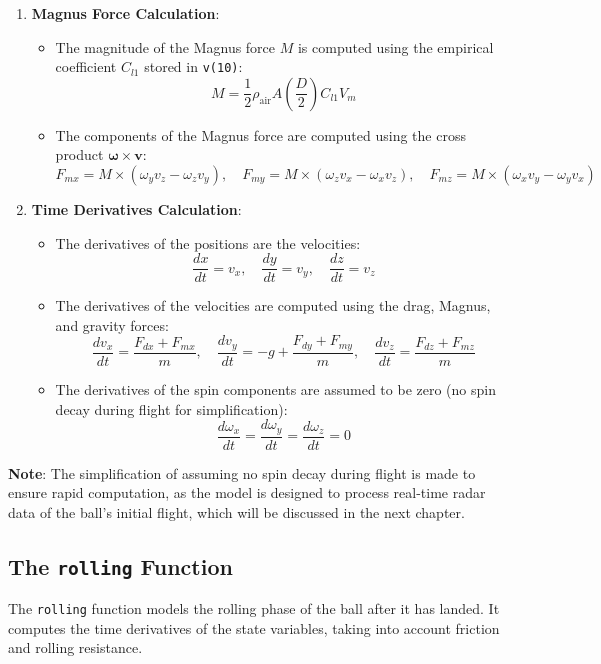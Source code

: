 \documentclass[10pt,a4paper]{report}
\begin{document}
\begin{enumerate}
    \item \textbf{Magnus Force Calculation}:
    \begin{itemize}
        \item The magnitude of the Magnus force \(M\) is computed using the empirical coefficient \(C_{l1}\) stored in \texttt{v(10)}:
        \[
        M = \frac{1}{2} \rho_{\text{air}} A \left(\frac{D}{2}\right) C_{l1} V_m
        \]
        \item The components of the Magnus force are computed using the cross product \(\boldsymbol{\omega} \times \mathbf{v}\):
        \[
        F_{mx} = M \times (\omega_y v_z - \omega_z v_y), \quad F_{my} = M \times (\omega_z v_x - \omega_x v_z), \quad F_{mz} = M \times (\omega_x v_y - \omega_y v_x)
        \]
    \end{itemize}

    \item \textbf{Time Derivatives Calculation}:
    \begin{itemize}
        \item The derivatives of the positions are the velocities:
        \[
        \frac{dx}{dt} = v_x, \quad \frac{dy}{dt} = v_y, \quad \frac{dz}{dt} = v_z
        \]
        \item The derivatives of the velocities are computed using the drag, Magnus, and gravity forces:
        \[
        \frac{dv_x}{dt} = \frac{F_{dx} + F_{mx}}{m}, \quad \frac{dv_y}{dt} = -g + \frac{F_{dy} + F_{my}}{m}, \quad \frac{dv_z}{dt} = \frac{F_{dz} + F_{mz}}{m}
        \]
        \item The derivatives of the spin components are assumed to be zero (no spin decay during flight for simplification):
        \[
        \frac{d\omega_x}{dt} = \frac{d\omega_y}{dt} = \frac{d\omega_z}{dt} = 0
        \]
    \end{itemize}
\end{enumerate}

\textbf{Note}: The simplification of assuming no spin decay during flight is made to ensure rapid computation, as the model is designed to process real-time radar data of the ball's initial flight, which will be discussed in the next chapter.

\bigskip
\subsection{The \texttt{rolling} Function}
\label{subsec:rolling}

The \texttt{rolling} function models the rolling phase of the ball after it has landed. It computes the time derivatives of the state variables, taking into account friction and rolling resistance.
\end{document}
